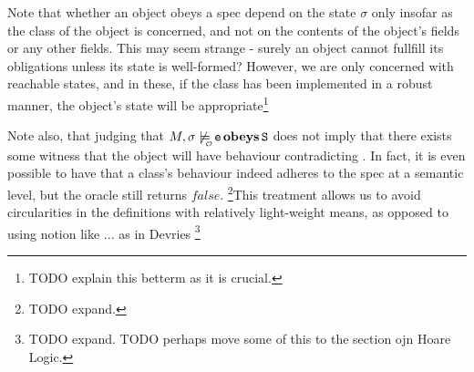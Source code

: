  Note that whether an object
obeys a spec depend on the state $\sigma$ only insofar as the class of the object is concerned, and not on the contents of the object's fields or any other fields. This may seem strange - surely an object cannot fullfill its obligations unless its state is well-formed? However, we are only concerned with reachable states, and in these, if the class has been implemented in a robust manner, the object's state will be appropriate\footnote{TODO explain this betterm as it is crucial.}

Note also, that judging that $\M,\sigma  \not\modelsWithO \sE \obeys  \prg{S}$ does not imply that there exists some witness 
that the object will have behaviour contradicting .
 In fact, it is even possible to have that a class's behaviour indeed adheres to the spec at a semantic level, but the oracle still returns $false$. 
 \footnote{ TODO expand. }This treatment allows us to avoid circularities in the definitions with relatively light-weight means, 
 as opposed to using notion like ... as in Devries  \footnote{ TODO expand.  TODO perhaps move some of this to the section ojn Hoare  Logic. }
 


